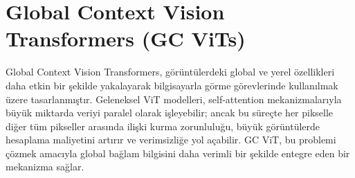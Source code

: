\section{Global Context Vision Transformers (GC ViTs)}

Global Context Vision Transformers, görüntülerdeki global ve yerel özellikleri daha etkin bir şekilde yakalayarak bilgisayarla görme görevlerinde kullanılmak üzere tasarlanmıştır. Geleneksel ViT modelleri, self-attention mekanizmalarıyla büyük miktarda veriyi paralel olarak işleyebilir; ancak bu süreçte her pikselle diğer tüm pikseller arasında ilişki kurma zorunluluğu, büyük görüntülerde hesaplama maliyetini artırır ve verimsizliğe yol açabilir. GC ViT, bu problemi çözmek amacıyla global bağlam bilgisini daha verimli bir şekilde entegre eden bir mekanizma sağlar.

\newpage